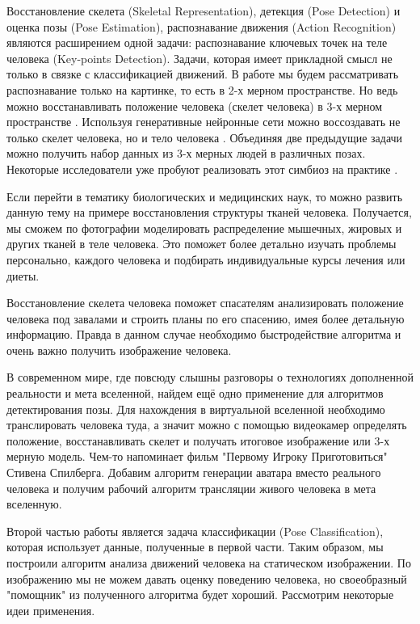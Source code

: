 Восстановление скелета (Skeletal Representation), детекция (Pose Detection) и оценка позы (Pose Estimation), распознавание движения (Action Recognition) являются расширением одной задачи: распознавание ключевых точек на теле человека (Key-points Detection). Задачи, которая имеет прикладной смысл не только в связке с классификацией движений. В работе мы будем рассматривать распознавание только на картинке, то есть в 2-х мерном пространстве. Но ведь можно восстанавливать положение человека (скелет человека) в 3-х мерном пространстве \cite{WANG2021103225, 8100086}. Используя генеративные нейронные сети можно воссоздавать не только скелет человека, но и тело человека \cite{Zhang_2017_CVPR}. Объединяя две предыдущие задачи можно получить набор данных из 3-х мерных людей в различных позах. Некоторые исследователи уже пробуют реализовать этот симбиоз на практике \cite{varol17_surreal}.

Если перейти в тематику биологических и медицинских наук, то можно развить данную тему на примере восстановления структуры тканей человека. Получается, мы сможем по фотографии моделировать распределение мышечных, жировых и других тканей в теле человека. Это поможет более детально изучать проблемы персонально, каждого человека и подбирать индивидуальные курсы лечения или диеты.

Восстановление скелета человека поможет спасателям анализировать положение человека под завалами и строить планы по его спасению, имея более детальную информацию. Правда в данном случае необходимо быстродействие алгоритма и очень важно получить изображение человека.

В современном мире, где повсюду слышны разговоры о технологиях дополненной реальности и мета вселенной, найдем ещё одно применение для алгоритмов детектирования позы. Для нахождения в виртуальной вселенной необходимо транслировать человека туда, а значит можно с помощью видеокамер определять положение, восстанавливать скелет и получать итоговое изображение или 3-х мерную модель. Чем-то напоминает фильм "Первому Игроку Приготовиться"{} Стивена Спилберга. Добавим алгоритм генерации аватара вместо реального человека и получим рабочий алгоритм трансляции живого человека в мета вселенную.

\hfill \break
Второй частью работы является задача классификации (Pose Classification), которая использует данные, полученные в первой части. Таким образом, мы построили алгоритм анализа движений человека на статическом изображении. По изображению мы не можем давать оценку поведению человека, но своеобразный "помощник"{} из полученного алгоритма будет хороший. Рассмотрим некоторые идеи применения.

